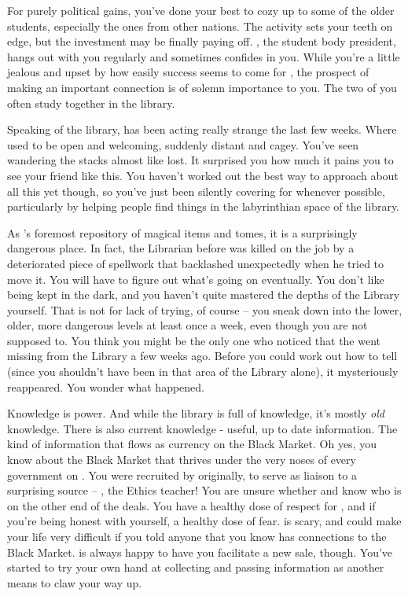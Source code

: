 \documentclass[char]{GL2020}
\begin{document}
For purely political gains, you've done your best to cozy up to some of the older students, especially the ones from other nations. The activity sets your teeth on edge, but the investment may be finally paying off. \cPresident{\full}, the student body president, hangs out with you regularly and sometimes confides in you. While you're a little jealous and upset by how easily success seems to come for \cPresident{}, the prospect of making an important connection is of solemn importance to you. The two of you often study together in the library.

Speaking of the library, \cLibrarian{} has been acting really strange the last few weeks. Where \cLibrarian{\they} used to be open and welcoming, \cLibrarian{\theyare} suddenly distant and cagey. You've seen \cLibrarian{\them} wandering the stacks almost like \cLibrarian{\they} \cLibrarian{\were} lost. It surprised you how much it pains you to see your friend like this. You haven't worked out the best way to approach \cLibrarian{\them} about all this yet though, so you've just been silently covering for \cLibrarian{\them} whenever possible, particularly by helping people find things in the labyrinthian space of the library. 

As \pEarth{}'s foremost repository of magical items and tomes, it is a surprisingly dangerous place. In fact, the Librarian before \cLibrarian{} was killed on the job by a deteriorated piece of spellwork that backlashed unexpectedly when he tried to move it. You will have to figure out what's going on eventually. You don't like being kept in the dark, and you haven't quite mastered the depths of the Library yourself. That is not for lack of trying, of course – you sneak down into the lower, older, more dangerous levels at least once a week, even though you are not supposed to. You think you might be the only one who noticed that the \iScythe{} went missing from the Library a few weeks ago. Before you could work out how to tell \cLibrarian{} (since you shouldn't have been in that area of the Library alone), it mysteriously reappeared. You wonder what happened.

Knowledge is power. And while the library is full of knowledge, it's mostly \emph{old} knowledge. There is also current knowledge - useful, up to date information. The kind of information that flows as currency on the Black Market. Oh yes, you know about the Black Market that thrives under the very noses of every government on \pEarth{}. You were recruited by \cChupSecond{\full} originally, to serve as liaison to a surprising source -- \cEthics{\full}, the Ethics teacher! You are unsure whether \cEthics{} and \cChupSecond{} know who is on the other end of the deals. You have a healthy dose of respect for \cChupSecond{}, and if you're being honest with yourself, a healthy dose of fear. \cChupSecond{\They} is scary, and could make your life very difficult if you told anyone that you know \cChupSecond{} has connections to the Black Market. \cChupSecond{\They} is always happy to have you facilitate a new sale, though. You've started to try your own hand at collecting and passing information as another means to claw your way up.
\end{document}
